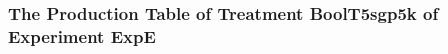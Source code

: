  \begin{frame}
 \fontsize{8pt}{9pt}\selectfont
 \frametitle{ The Production Table of Treatment BoolT5sgp5k of Experiment ExpE }

 \label{ExpEGrammarTable011.tex}  
 \end{frame}

